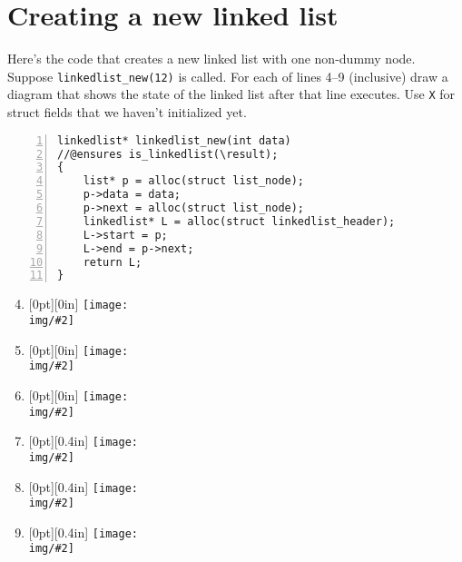 \newpage
\section*{Creating a new linked list%
}

Here's the code that creates a new linked list with one non-dummy
node. Suppose \lstinline'linkedlist_new(12)' is called. For each of
lines 4--9 (inclusive) draw a diagram that shows the state of the
linked list after that line executes.  Use \lstinline'X' for struct
fields that we haven't initialized yet.

\begin{lstlisting}[numbers=left]
linkedlist* linkedlist_new(int data)
//@ensures is_linkedlist(\result);
{
    list* p = alloc(struct list_node);
    p->data = data;
    p->next = alloc(struct list_node);
    linkedlist* L = alloc(struct linkedlist_header);
    L->start = p;
    L->end = p->next;
    return L;
}
\end{lstlisting}

\begin{enumerate}[1.]
\setcounter{enumi}{3}
\newcommand{\soldepth}{0in}
\newcommand{\solraise}{-0.58}
\newcommand{\displaysol}[2][0.43]
  {\raisebox{\solraise\height}[0pt][\soldepth]{%
      \texttt{[image: \\img/\#2]}}}

\item%
  \begin{solution}\displaysol[0.27]{new-4.png}\end{solution}
  \vspace{0.5in}
\item%
  \begin{solution}\displaysol[0.27]{new-5.png}\end{solution}
  \vspace{0.5in}
\item%
  \begin{solution}\displaysol{new-6.png}\end{solution}
  \renewcommand{\soldepth}{0.4in}
  \renewcommand{\solraise}{-0.79}
  \vspace{0.5in}
\item%
  \begin{solution}\displaysol{new-7.png}\end{solution}
  \vspace{0.5in}
\item%
  \begin{solution}\displaysol{new-8.png}\end{solution}
  \vspace{0.5in}
\item%
  \begin{solution}\displaysol{new-9.png}\end{solution}
  \vspace{0.5in}
\end{enumerate}
